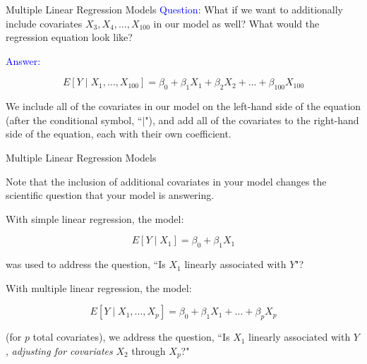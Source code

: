 \documentclass[10pt,t]{beamer}
\begin{document}
\begin{frame}{Multiple Linear Regression Models}
\textcolor{blue}{Question}: What if we want to additionally include covariates $X_3, X_4, \dots, X_{100}$ in our model as well? What would the regression equation look like?

\vspace{0.3cm}

\textcolor{blue}{Answer:} 

$$
E[Y \mid X_1, \dots, X_{100}] = \beta_0 + \beta_1 X_1 + \beta_2 X_2 + \dots + \beta_{100} X_{100}
$$

We include all of the covariates in our model on the left-hand side of the equation (after the conditional symbol, ``$|$"), and add all of the covariates to the right-hand side of the equation, each with their own coefficient.

\end{frame}


\begin{frame}{Multiple Linear Regression Models}
	\vspace{-5 mm}
	
Note that the inclusion of additional covariates in your model changes the scientific question that your model is answering.

\vspace{0.3cm}

With simple linear regression, the model:

\[E[Y \mid X_1] = \beta_0 + \beta_1 X_1\]

 was used to address the question, ``Is $X_1$ linearly associated with $Y$"?  \pause

\vspace{0.3cm}

With multiple linear regression, the model:

 \[E[Y \mid X_1, \dots, X_p] = \beta_0 + \beta_1 X_1 + \dots + \beta_p X_p\]

 (for $p$ total covariates), we address the question, ``Is $X_1$ linearly associated with $Y$, \textit{adjusting for covariates} $X_2$ through $X_p$?" 
\end{frame}
\end{document}
